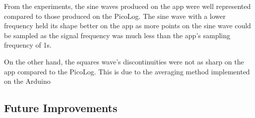 

From the experiments, the sine waves produced on the app were well represented compared to those produced on the PicoLog. The sine wave with a lower frequency held its shape better on the app as more points on the sine wave could be sampled as the signal frequency was much less than the app's sampling frequency of 1s. 

On the other hand, the squares wave's discontinuities were not as sharp on the app compared to the PicoLog. This is due to the averaging method implemented on the Arduino 

\subsection{Future Improvements}